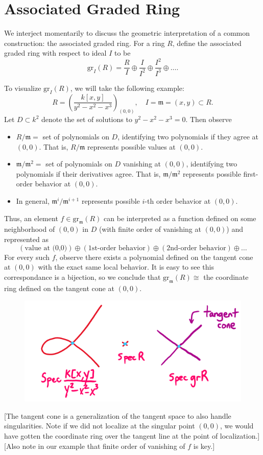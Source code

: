 \section{Associated Graded Ring}

We interject momentarily to discuss the geometric interpretation of a common construction: the associated graded ring. For a ring $R$, define the associated graded ring with respect to ideal $I$ to be
\[
    \text{gr}_I(R) = \frac{R}{I} \oplus \frac{I}{I^2} \oplus \frac{I^2}{I^3} \oplus \dots.
\]

To visualize $\text{gr}_I(R)$, we will take the following example:
\[
    R = \left( \frac{k[x,y]}{y^2 - x^2 - x^3} \right)_{(0,0)}, \quad I = \mathfrak m = (x,y) \subset R.
\]
Let $D \subset k^2$ denote the set of solutions to $y^2 - x^2 - x^3 = 0$. Then observe
\begin{itemize}
    \item $R/\mathfrak m = $ set of polynomials on $D$, identifying two polynomials if they agree at $(0,0)$. That is, $R/\mathfrak m$ represents possible values at $(0,0)$.
    \item $\mathfrak m/\mathfrak m^2 = $ set of polynomials on $D$ vanishing at $(0,0)$, identifying two polynomials if their derivatives agree. That is, $\mathfrak m/\mathfrak m^2$ represents possible first-order behavior at $(0,0)$.
    \item In general, $\mathfrak m^i/\mathfrak m^{i+1}$ represents possible $i$-th order behavior at $(0,0)$.
\end{itemize}
Thus, an element $f \in \text{gr}_{\mathfrak m}(R)$ can be interpreted as a function defined on some neighborhood of $(0,0)$ in $D$ (with finite order of vanishing at $(0,0)$) and represented as
\[
    (\text{value at (0,0)}) \oplus (\text{1st-order behavior}) \oplus (\text{2nd-order behavior}) \oplus \dots
\]
For every such $f$, observe there exists a polynomial defined on the tangent cone at $(0,0)$ with the exact same local behavior. It is easy to see this correspondance is a bijection, so we conclude that $\text{gr}_{\mathfrak m}(R) \cong$ the coordinate ring defined on the tangent cone at $(0,0)$.
\begin{figure}[H]
    \centering
    \includegraphics[width=0.6\linewidth]{figures/tangent-cone.png}
\end{figure}

[The tangent cone is a generalization of the tangent space to also handle singularities. Note if we did not localize at the singular point $(0,0)$, we would have gotten the coordinate ring over the tangent line at the point of localization.] [Also note in our example that finite order of vanishing of $f$ is key.]
